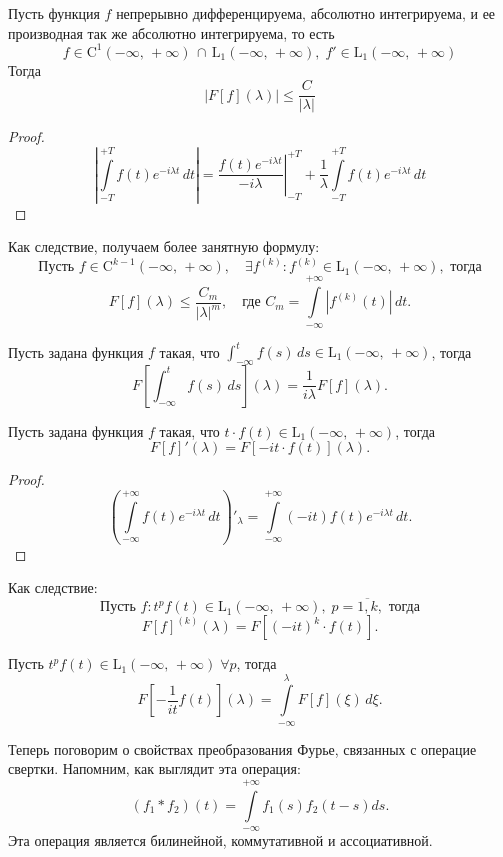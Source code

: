 \begin{theorem}
        Пусть функция $f$ непрерывно дифференцируема, абсолютно интегрируема, и ее производная так же абсолютно интегрируема, то есть
$$
        f \in \mathrm{C}^1(-\infty,\,+\infty)\,\cap\,\mathrm{L}_1(-\infty,\,+\infty),\;f' \in \mathrm{L}_1(-\infty,\,+\infty)
$$
        Тогда
$$
        |F[f](\lambda)| \leqslant \frac{C}{|\lambda|}
$$
\end{theorem}
\begin{proof}
$$
        \left|\int\limits_{-T}^{+T} f(t) e^{-i\lambda t}\,dt\right|
        = \left.\frac{f(t)e^{-i\lambda t}}{-i\lambda}\right|_{-T}^{+T} + \frac{1}{\lambda}\int\limits_{-T}^{+T} f(t) e^{-i\lambda t}\,dt
$$
\end{proof}
\begin{remark}
        Как следствие, получаем более занятную формулу:
$$
        \mbox{Пусть } f \in \mathrm{C}^{k-1}(-\infty,\,+\infty),\quad \exists f^{(k)}:f^{(k)}\in\mathrm{L}_1(-\infty,\,+\infty), \mbox{ тогда} 
$$
$$
        F[f](\lambda) \leqslant \frac{C_m}{|\lambda|^m},\quad \mbox{где } C_m = \int\limits_{-\infty}^{+\infty}|f^{(k)}(t)|\,dt.
$$
\end{remark}
\begin{theorem}
        Пусть задана функция $f$ такая, что $\int_{-\infty}^t f(s)\,ds \in \mathrm{L}_1(-\infty,\,+\infty)$, тогда
$$
        F\left[
\int_{-\infty}^t f(s)\,ds
        \right] (\lambda)
=
        \frac1{i\lambda}F[f](\lambda).
$$
\end{theorem}
\begin{theorem}
        Пусть задана функция $f$ такая, что $t\cdot f(t) \in \mathrm{L}_1(-\infty,\,+\infty)$, тогда
$$
        F[f]'(\lambda) = F[-it\cdot f(t)](\lambda).
$$
\end{theorem}
\begin{proof}
$$
        \left(
\int\limits_{-\infty}^{+\infty}f(t)e^{-i\lambda t}\,dt
        \right)'_{\lambda}
=
        \int\limits_{-\infty}^{+\infty} (-it)f(t)e^{-i\lambda t}\,dt.
$$
\end{proof}
\begin{remark}
        Как следствие:
$$
        \mbox{Пусть } f : t^pf(t)\in \mathrm{L}_1(-\infty,\,+\infty), \; p = \overline{1, k}, \mbox{ тогда}
$$
$$
        F[f]^{(k)}(\lambda) = F[(-it)^k\cdot f(t)].
$$
\end{remark}
\begin{theorem}
        Пусть $t^p f(t) \in \mathrm{L}_1(-\infty,\,+\infty)\;\forall p$, тогда
$$
        F\left[
-\frac{1}{it}f(t)
        \right] (\lambda)
=
        \int\limits_{-\infty}^{\lambda} F[f](\xi)\,d\xi.
$$
\end{theorem}

Теперь поговорим о свойствах преобразования Фурье, связанных с операцие свертки. Напомним, как выглядит эта операция:
$$
        (f_1 * f_2)(t) = \int\limits_{-\infty}^{+\infty}f_1(s)f_2(t-s)ds.
$$
Эта операция является билинейной, коммутативной и ассоциативной.